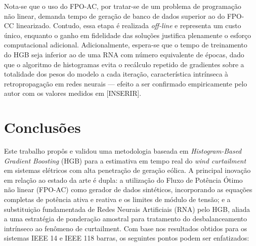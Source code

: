 \documentclass[conference]{IEEEtran}
\begin{document}
Nota-se que o uso do FPO-AC, por tratar-se de um problema de programação
não linear, demanda tempo de geração de banco de dados superior ao do
FPO-CC linearizado. Contudo, essa etapa é realizada \textit{off-line} e
representa um custo único, enquanto o ganho em fidelidade das soluções
justifica plenamente o esforço computacional adicional. Adicionalmente,
espera-se que o tempo de treinamento do HGB seja inferior ao de uma RNA
com número equivalente de épocas, dado que o algoritmo de histogramas
evita o recálculo repetido de gradientes sobre a totalidade dos pesos do
modelo a cada iteração, característica intrínseca à retropropagação em
redes neurais — efeito a ser confirmado empiricamente pelo autor com os
valores medidos em [INSERIR].

\section{Conclusões}

Este trabalho propôs e validou uma metodologia baseada em
\textit{Histogram-Based Gradient Boosting} (HGB) para a estimativa em tempo real do \textit{wind curtailment}
em sistemas elétricos com alta penetração de geração eólica. A principal
inovação em relação ao estado da arte é dupla: a utilização do Fluxo de
Potência Ótimo não linear (FPO-AC) como gerador de dados sintéticos,
incorporando as equações completas de potência ativa e reativa e os limites de módulo
de tensão; e a substituição fundamentada de Redes Neurais Artificiais
(RNA) pelo HGB, aliada a uma estratégia de ponderação amostral para
tratamento do desbalanceamento intrínseco ao fenômeno de curtailment.
Com base nos resultados obtidos para os sistemas IEEE 14 e
IEEE 118 barras, os seguintes pontos podem ser enfatizados:
\end{document}
